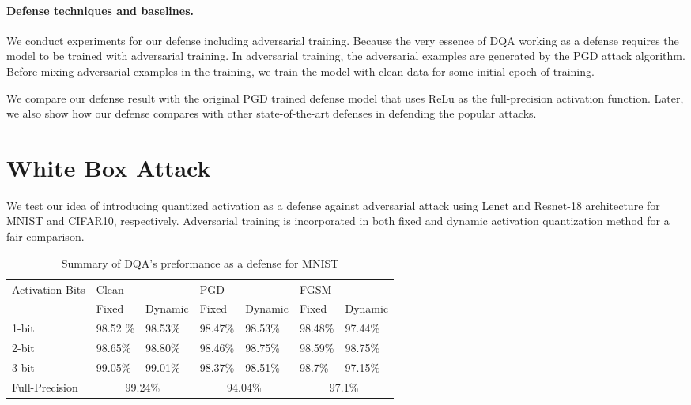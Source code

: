 \documentclass{article}
\begin{document}
\paragraph{Defense techniques and baselines.}
We conduct experiments for our defense including adversarial training. Because the very essence of DQA working as a defense requires the model to be trained with adversarial training. In adversarial training, the adversarial examples are generated by the PGD attack algorithm. Before mixing adversarial examples in the training, we train the model with clean data for some initial epoch of training. 

We compare our defense result with the original PGD trained defense model \cite{madry2017towards} that uses ReLu as the full-precision activation function. Later, we also show how our defense compares with other state-of-the-art defenses in defending the popular attacks.

\section{White Box Attack}
We test our idea of introducing quantized activation as a defense against adversarial attack using Lenet and Resnet-18 architecture for MNIST and CIFAR10, respectively. Adversarial training is incorporated in both fixed and dynamic activation quantization method for a fair comparison.  

\begin{table}[ht]
\begin{tabular}{|l|l|l|l|l|l|l|}
\hline
\multirow{2}{*}{Activation Bits} & \multicolumn{2}{l|}{Clean} & \multicolumn{2}{l|}{PGD} & \multicolumn{2}{l|}{FGSM} \\ \cline{2-7} 
 & Fixed & Dynamic & Fixed & Dynamic & Fixed & Dynamic \\ \hline
1-bit & 98.52 \% & 98.53\% & 98.47\% & 98.53\% & 98.48\% & 97.44\% \\ \hline
2-bit & 98.65\% & 98.80\% & 98.46\% & 98.75\% & 98.59\% & 98.75\% \\ \hline
3-bit & 99.05\% & 99.01\% & 98.37\% & 98.51\% & 98.7\% & 97.15\% \\ \hline
Full-Precision & \multicolumn{2}{c|}{99.24\%} & \multicolumn{2}{c|}{94.04\%} & \multicolumn{2}{c|}{97.1\%} \\ \hline
\end{tabular}
\centering
\caption{Summary of DQA's preformance as a defense for MNIST}
\label{tab:2}
\end{table}
\end{document}

